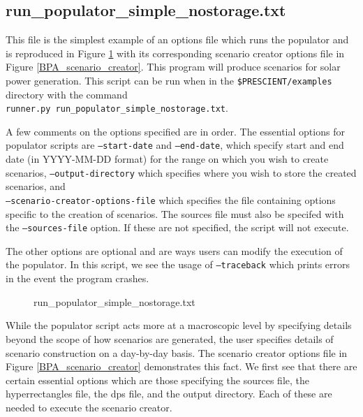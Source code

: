 \documentclass[11pt]{article}
\begin{document}
\subsection{run\_populator\_simple\_nostorage.txt}
This file is the simplest example of an options file which runs the populator and is reproduced in Figure \ref{BPA_populator} with its corresponding scenario creator options file in Figure \ref{BPA_scenario_creator}. This program will produce scenarios for solar power generation. This script can be run when in the \texttt{\$PRESCIENT/examples} directory with the command \\ \texttt{runner.py run\_populator\_simple\_nostorage.txt}. 

A few comments on the options specified are in order. The essential options for populator scripts are \texttt{--start-date} and \texttt{--end-date}, which specify start and end date (in YYYY-MM-DD format) for the range on which you wish to create scenarios, \texttt{--output-directory} which specifies where you wish to store the created scenarios, and \\ \texttt{--scenario-creator-options-file} which specifies the file containing options specific to the creation of scenarios. The sources file must also be specifed with the \texttt{--sources-file} option. If these are not specified, the script will not execute.

The other options are optional and are ways users can modify the execution of the populator. In this script, we see the usage of \texttt{--traceback} which prints errors in the event the program crashes.



\begin{figure}
	\begin{framed}
		
	\end{framed}
	\caption{run\_populator\_simple\_nostorage.txt}
	\label{BPA_populator}
\end{figure}

While the populator script acts more at a macroscopic level by specifying details beyond the scope of how scenarios are generated, the user specifies details of scenario construction on a day-by-day basis. The scenario creator options file in Figure \ref{BPA_scenario_creator} demonstrates this fact. We first see that there are certain essential options which are those specifying the sources file, the hyperrectangles file, the dps file, and the output directory. Each of these are needed to execute the scenario creator.
\end{document}
